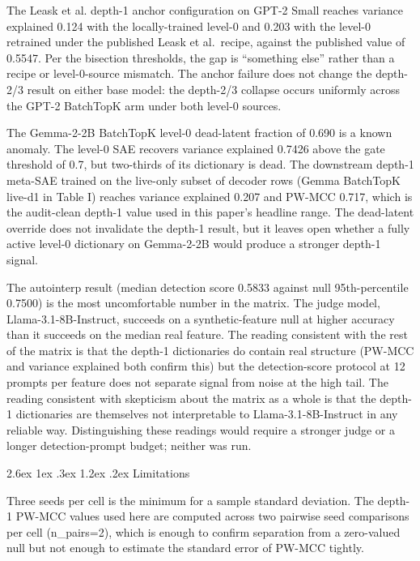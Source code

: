 \documentclass[conference]{IEEEtran}
\makeatletter
\renewcommand\section{\@startsection{section}{1}{\z@}%
   {2.6ex \@plus 1ex \@minus .3ex}%
   {1.2ex \@plus .2ex}%
   {\normalfont\Large\bfseries\centering}}
\makeatother
\begin{document}
The Leask et al. \autocite{leask2025sparse} depth-1 anchor configuration
on GPT-2 Small reaches variance explained 0.124 with the locally-trained
level-0 and 0.203 with the level-0 retrained under the published Leask
et al.~recipe, against the published value of 0.5547. Per the bisection
thresholds, the gap is ``something else'' rather than a recipe or
level-0-source mismatch. The anchor failure does not change the
depth-2/3 result on either base model: the depth-2/3 collapse occurs
uniformly across the GPT-2 BatchTopK arm under both level-0 sources.

The Gemma-2-2B BatchTopK level-0 dead-latent fraction of 0.690 is a
known anomaly. The level-0 SAE recovers variance explained 0.7426 above
the gate threshold of 0.7, but two-thirds of its dictionary is dead. The
downstream depth-1 meta-SAE trained on the live-only subset of decoder
rows (Gemma BatchTopK live-d1 in Table I) reaches variance explained
0.207 and PW-MCC 0.717, which is the audit-clean depth-1 value used in
this paper's headline range. The dead-latent override does not
invalidate the depth-1 result, but it leaves open whether a fully active
level-0 dictionary on Gemma-2-2B would produce a stronger depth-1
signal.

The autointerp result (median detection score 0.5833 against null
95th-percentile 0.7500) is the most uncomfortable number in the matrix.
The judge model, Llama-3.1-8B-Instruct, succeeds on a synthetic-feature
null at higher accuracy than it succeeds on the median real feature. The
reading consistent with the rest of the matrix is that the depth-1
dictionaries do contain real structure (PW-MCC and variance explained
both confirm this) but the detection-score protocol at 12 prompts per
feature does not separate signal from noise at the high tail. The
reading consistent with skepticism about the matrix as a whole is that
the depth-1 dictionaries are themselves not interpretable to
Llama-3.1-8B-Instruct in any reliable way. Distinguishing these readings
would require a stronger judge or a longer detection-prompt budget;
neither was run.

\hypertarget{limitations}{%
\section{Limitations}\label{limitations}}

Three seeds per cell is the minimum for a sample standard deviation. The
depth-1 PW-MCC values used here are computed across two pairwise seed
comparisons per cell (n\_pairs=2), which is enough to confirm separation
from a zero-valued null but not enough to estimate the standard error of
PW-MCC tightly.
\end{document}
